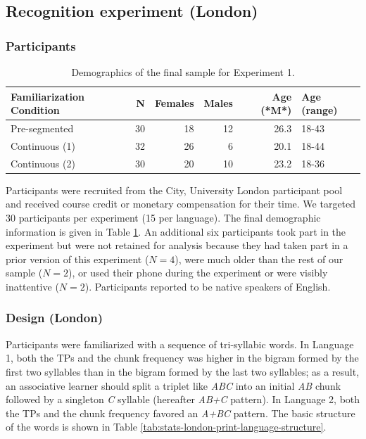\documentclass[
]{article}
\begin{document}
\subsection{Recognition experiment
(London)}\label{recognition-experiment-london}

\subsubsection{Participants}\label{participants-1}

\begin{longtable}[t]{lrrrrl}
\caption{\label{tab:stats-london-demographics-print}Demographics of the final sample for Experiment 1.}\\
\toprule
Familiarization Condition & N & Females & Males & Age (*M*) & Age (range)\\
\midrule
Pre-segmented & 30 & 18 & 12 & 26.3 & 18-43\\
Continuous (1) & 32 & 26 & 6 & 20.1 & 18-44\\
Continuous (2) & 30 & 20 & 10 & 23.2 & 18-36\\
\bottomrule
\end{longtable}

Participants were recruited from the City, University London participant
pool and received course credit or monetary compensation for their time.
We targeted 30 participants per experiment (15 per language). The final
demographic information is given in Table
\ref{tab:stats-london-demographics-print}. An additional six
participants took part in the experiment but were not retained for
analysis because they had taken part in a prior version of this
experiment (\(N = 4\)), were much older than the rest of our sample
(\(N = 2\)), or used their phone during the experiment or were visibly
inattentive (\(N = 2\)). Participants reported to be native speakers of
English.

\subsubsection{Design (London)}\label{design-london}

Participants were familiarized with a sequence of tri-syllabic words. In
Language 1, both the TPs and the chunk frequency was higher in the
bigram formed by the first two syllables than in the bigram formed by
the last two syllables; as a result, an associative learner should split
a triplet like \emph{ABC} into an initial \emph{AB} chunk followed by a
singleton \emph{C} syllable (hereafter \emph{AB+C} pattern). In Language
2, both the TPs and the chunk frequency favored an \emph{A+BC} pattern.
The basic structure of the words is shown in Table
\ref{tab:stats-london-print-language-structure}.
\end{document}
